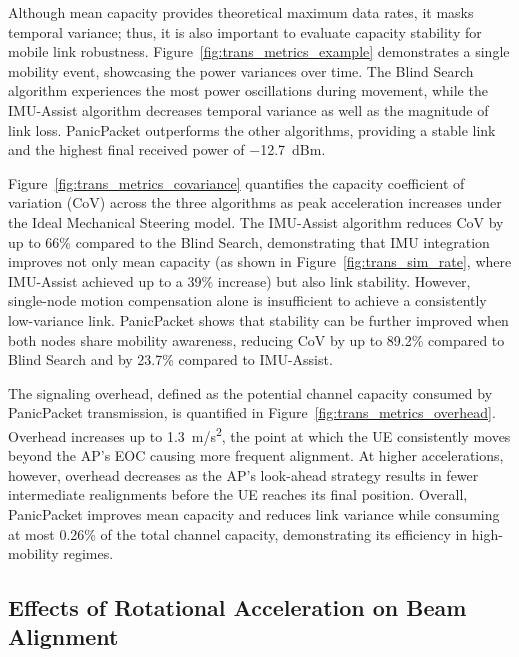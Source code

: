 \documentclass[fleqn,10pt]{wlscirep}
\begin{document}
Although mean capacity provides theoretical maximum data rates, it masks temporal variance; thus, it is also important to evaluate capacity stability for mobile link robustness. Figure~\ref{fig:trans_metrics_example} demonstrates a single mobility event, showcasing the power variances over time. The Blind Search algorithm experiences the most power oscillations during movement, while the IMU-Assist algorithm decreases temporal variance as well as the magnitude of link loss. PanicPacket outperforms the other algorithms, providing a stable link and the highest final received power of \SI{-12.7}{dBm}.

Figure~\ref{fig:trans_metrics_covariance} quantifies the capacity coefficient of variation (CoV) across the three algorithms as peak acceleration increases under the Ideal Mechanical Steering model. The IMU-Assist algorithm reduces CoV by up to 66\% compared to the Blind Search, demonstrating that IMU integration improves not only mean capacity (as shown in Figure~\ref{fig:trans_sim_rate}, where IMU-Assist achieved up to a 39\% increase) but also link stability. However, single-node motion compensation alone is insufficient to achieve a consistently low-variance link. PanicPacket shows that stability can be further improved when both nodes share mobility awareness, reducing CoV by up to 89.2\% compared to Blind Search and by 23.7\% compared to IMU-Assist.

The signaling overhead, defined as the potential channel capacity consumed by PanicPacket transmission, is quantified in Figure~\ref{fig:trans_metrics_overhead}. Overhead increases up to \SI{1.3}{m/s^2}, the point at which the UE consistently moves beyond the AP's EOC causing more frequent alignment. At higher accelerations, however, overhead decreases as the AP's look-ahead strategy results in fewer intermediate realignments before the UE reaches its final position. Overall, PanicPacket improves mean capacity and reduces link variance while consuming at most 0.26\% of the total channel capacity, demonstrating its efficiency in high-mobility regimes.

\subsection*{Effects of Rotational Acceleration on Beam Alignment}
\end{document}
